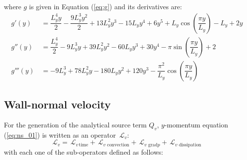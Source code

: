 \documentclass[10pt]{article}
\newcommand{\Lo}{\,\mathcal{L}}
\newcommand{\convection}{\,\text{convection}}
\newcommand{\gradp}{\,\text{grad}p}
\newcommand{\dissipation}{\,\text{dissipation}}
\begin{document}
%
where $g$ is given in Equation (\ref{eq:g}) and its derivatives are:
\begin{equation}
\begin{split}\label{eq:derivative_g}
\, g'(y) \,&= \dfrac{L_y^4 y}{2}-\dfrac{9 L_y^3 y^2}{2} +13 L_y^2 y^3-15 L_y y^4+6 y^5+L_y \cos\left(\dfrac{\pi y}{L_y}\right)-L_y+2 y\\
%
\, g''(y) \, &=  \dfrac{L_y^4}{2}-9 L_y^3 y+39 L_y^2 y^2-60 L_y y^3+30 y^4-\pi \sin\left(\dfrac{\pi y}{L_y}\right)+2\\
%
\, g'''(y) \,  &= -9 L_y^3+78 L_y^2 y-180 L_y y^2+120 y^3-\dfrac{\pi^2}{L_y} \cos\left(\dfrac{\pi y}{L_y}\right)
\end{split}
\end{equation}

\subsection{Wall-normal velocity}
For the generation of the analytical source term $Q_v$, $y$-momentum equation (\ref{eq:ns_01}) is written as an operator $\Lo_v$:
 $$\Lo_v = \Lo_{v \, \text{time}}+\Lo_{v \, \convection}+\Lo_{v \, \gradp }+\Lo_{v \, \dissipation }$$
with each one of the sub-operators defined as follows:
\end{document}
